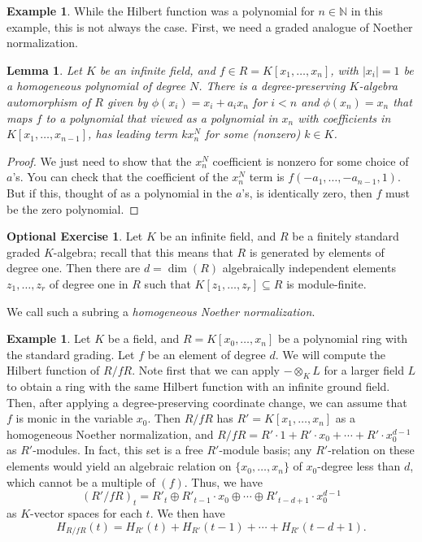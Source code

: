 \documentclass{amsart}[12pt]
\newcommand{\NN}{\mathbb{N}}
\newcommand{\DEF}[1]{\emph{#1}\index{#1}}
\numberwithin{equation}{section}
\theoremstyle{plain} %
\newtheorem{lem}[equation]{Lemma}
\theoremstyle{definition}
\newtheorem{ex}[equation]{Example}
\newtheorem{example}[equation]{Example}
\newtheorem{exer}[equation]{Optional Exercise}
\theoremstyle{remark}
\begin{document}
\begin{ex}
	

While the Hilbert function was a polynomial for $n\in\NN$ in this example, this is not always the case. First, we need a graded analogue of Noether normalization.

\begin{lem}  Let $K$ be an infinite field, and $f\in R=K[x_1,\dots,x_n]$, with $|x_i|=1$ be a homogeneous polynomial of degree $N$. There is a degree-preserving $K$-algebra automorphism of $R$ given by $\phi(x_i) = x_i + a_i x_n$ for $i<n$ and $\phi(x_n)=x_n$ that maps $f$ to a polynomial that viewed as a polynomial in $x_n$ with coefficients in $K[x_1,\dots,x_{n-1}]$, has leading term $k x_n^N$ for some (nonzero) $k\in K$.
\end{lem}
\begin{proof}
We just need to show that the $x_n^N$ coefficient is nonzero for some choice of $a$'s. You can check that the coefficient of the $x_n^N$ term is $f(-a_1,\dots,-a_{n-1},1)$. But if this, thought of as a polynomial in the $a$'s, is identically zero, then $f$ must be the zero polynomial.
\end{proof}


\begin{exer} Let $K$ be an infinite field, and $R$ be a finitely standard graded $K$-algebra; recall that this means that $R$ is generated by elements of degree one. Then there are $d=\dim(R)$ algebraically independent elements $z_1,\dots, z_r$ of degree one in $R$ such that $K[z_1,\dots,z_r] \subseteq R$ is module-finite.
\end{exer}

We call such a subring a \DEF{homogeneous Noether normalization}.


\begin{example}
Let $K$ be a field, and $R=K[x_0,\dots,x_n]$ be a polynomial ring with the standard grading. Let $f$ be an element of degree $d$. We will compute the Hilbert function of $R/fR$. Note first that we can apply $- \otimes_K L$ for a larger field $L$ to obtain a ring with the same Hilbert function with an infinite ground field. Then, after applying a degree-preserving coordinate change, we can assume that $f$ is monic in the variable $x_0$. Then $R/fR$ has $R'=K[x_1,\dots,x_{n}]$ as a homogeneous Noether normalization, and $R/fR= R'\cdot 1 + R'\cdot x_0 +  \cdots + R' \cdot x_0^{d-1}$ as $R'$-modules. In fact, this set is a free $R'$-module basis;
any $R'$-relation on these elements would yield an algebraic relation on $\{x_0,\dots,x_n\}$ of $x_0$-degree less than $d$, which cannot be a multiple of $(f)$. Thus, we have
\[ (R'/fR)_t = R'_t \oplus R'_{t-1} \cdot x_0 \oplus \cdots \oplus R'_{t-d+1} \cdot x_0^{d-1}\] as $K$-vector spaces for each $t$. We then have
\[ H_{R/fR}(t)= H_{R'}(t) + H_{R'}(t-1) + \cdots + H_{R'}(t-d+1).\]




\end{example}
\end{ex}
\end{document}
